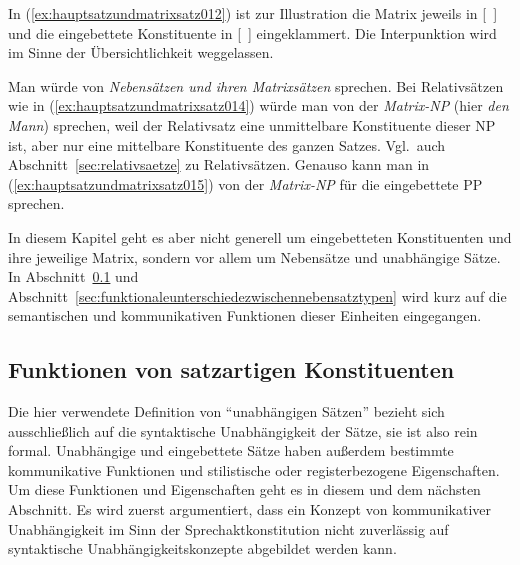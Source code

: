 In (\ref{ex:hauptsatzundmatrixsatz012}) ist zur Illustration die Matrix jeweils in [~] und die eingebettete Konstituente in [~] eingeklammert.
Die Interpunktion wird im Sinne der Übersichtlichkeit weggelassen.

\begin{exe}
  \ex\label{ex:hauptsatzundmatrixsatz012}
  \begin{xlist}
  \end{xlist}
\end{exe}

Man würde von \textit{Nebensätzen und ihren Matrixsätzen} sprechen.
Bei Relativsätzen wie in (\ref{ex:hauptsatzundmatrixsatz014}) würde man von der \textit{Matrix-NP} (hier \textit{den Mann}) sprechen, weil der Relativsatz eine unmittelbare Konstituente dieser NP ist, aber nur eine mittelbare Konstituente des ganzen Satzes.
Vgl.\ auch Abschnitt~\ref{sec:relativsaetze} zu Relativsätzen.
Genauso kann man in (\ref{ex:hauptsatzundmatrixsatz015}) von der \textit{Matrix-NP} für die eingebettete PP sprechen.

\begin{exe}
\end{exe}

In diesem Kapitel geht es aber nicht generell um eingebetteten Konstituenten und ihre jeweilige Matrix, sondern vor allem um Nebensätze und unabhängige Sätze.
In Abschnitt~\ref{sec:funktionenvonsatzartigenkonstituenten} und Abschnitt~\ref{sec:funktionaleunterschiedezwischennebensatztypen} wird kurz auf die semantischen und kommunikativen Funktionen dieser Einheiten eingegangen.


\subsection{Funktionen von satzartigen Konstituenten}
\label{sec:funktionenvonsatzartigenkonstituenten}

Die hier verwendete Definition von "`unabhängigen Sätzen"' bezieht sich ausschließlich auf die syntaktische Unabhängigkeit der Sätze, sie ist also rein formal.
Unabhängige und eingebettete Sätze haben außerdem bestimmte kommunikative Funktionen und stilistische oder registerbezogene Eigenschaften.
Um diese Funktionen und Eigenschaften geht es in diesem und dem nächsten Abschnitt.
Es wird zuerst argumentiert, dass ein Konzept von kommunikativer Unabhängigkeit im Sinn der Sprechaktkonstitution nicht zuverlässig auf syntaktische Unabhängigkeitskonzepte abgebildet werden kann.

